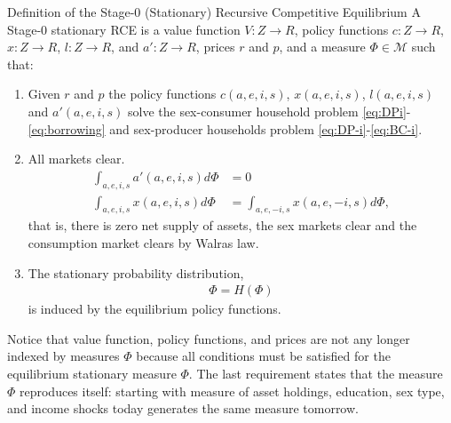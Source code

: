 
 

 \begin{myexampleblock}{Definition of the Stage-0 (Stationary) Recursive Competitive Equilibrium}  A Stage-0 stationary  RCE is a value function $V: {Z} \rightarrow R$, policy functions $c: Z \rightarrow R$, $x: Z \rightarrow R$, $l: Z \rightarrow R$, and $a': Z \rightarrow R$, prices $r$ and $p$, and a measure $\Phi \in \mathcal{M}$ such that:
 \begin{enumerate}
 \item Given $r$ and $p$ the policy functions $c(a,e,i,s)$, $x(a,e,i,s)$, $l(a,e,i,s)$ and $a'(a,e,i,s)$ solve the sex-consumer household problem \eqref{eq:DPi}-\eqref{eq:borrowing} and sex-producer households problem  \eqref{eq:DP-i}-\eqref{eq:BC-i}.
 \item All markets clear.
 \begin{align*}
\int_{a,e,i,s} a'(a,e,i,s) d\Phi &= 0 \\
\int_{a,e,i,s} x(a,e,i,s) d \Phi &= \int_{a,e,-i,s} x(a,e,-i,s) d\Phi,
\end{align*}
 that is, there is zero net supply of assets, the sex markets clear and the consumption market clears by Walras law.
 \item The stationary probability distribution,
 \begin{align*}
     \Phi = H(\Phi)
 \end{align*}
 is induced by the equilibrium policy functions.
  \end{enumerate}
Notice that value function, policy functions, and prices are not any longer indexed by measures $\Phi$ because all conditions must be satisfied  for the equilibrium stationary measure $\Phi$. The last requirement states that the measure $\Phi$ reproduces itself: starting with measure of asset holdings, education, sex type, and income shocks  today generates the same measure tomorrow. 
  \end{myexampleblock}

